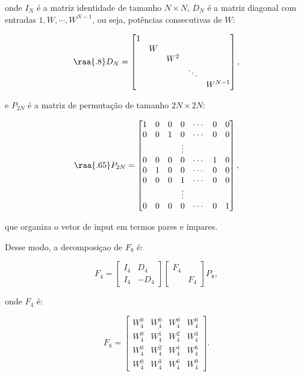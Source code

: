 onde $I_{N}$ é a matriz identidade de tamanho $N \times N$, $D_{N}$ é a matriz diagonal com entradas $1, W, \cdots, W^{N-1}$, ou seja, potências consecutivas de $W$:

\begin{equation*}
\raa{.8}
D_{N} = 
\begin{bmatrix}
1 &  &  &  & \\
 & W &  &  & \\
 &  & W^{2} &  & \\
 &  &  & \ddots  & \\
 &  &  &  & W^{N-1}
\end{bmatrix},
\end{equation*}

e $P_{2N}$ é a matriz de permutação de tamanho $2N \times 2N$: 

\begin{equation*}
\raa{.65}
P_{2N} = 
\begin{bmatrix}
1 & 0 & 0 &    0   & \cdots & 0 & 0\\
0 & 0 & 1 &    0   & \cdots & 0 & 0\\
  &   &   & \vdots &        &   &  \\
0 & 0 & 0 &    0   & \cdots & 1 & 0\\
0 & 1 & 0 &    0   & \cdots & 0 & 0\\
0 & 0 & 0 &    1   & \cdots & 0 & 0\\
  &   &   & \vdots &        &   &  \\
0 & 0 & 0 &    0   & \cdots & 0 & 1
\end{bmatrix},
\end{equation*}

que organiza o vetor de input em termos pares e ímpares.

Desse modo, a decomposiçao de $F_{8}$ é:

\begin{equation*}
F_{4} = 
\begin{bmatrix}
I_{4} & D_{4}\\
I_{4} & -D_{4} 
\end{bmatrix}
\begin{bmatrix}
F_{4} & \\
 & F_{4} 
\end{bmatrix}
P_{8},
\end{equation*}

onde $F_{4}$ é:

\begin{equation*}
F_{8} = 
\begin{bmatrix}
W_{4}^{0} & W_{4}^{0} & W_{4}^{0} & W_{4}^{0} \\
W_{4}^{0} & W_{4}^{1} & W_{4}^{2} & W_{4}^{3} \\
W_{4}^{0} & W_{4}^{2} & W_{4}^{4} & W_{4}^{6} \\
W_{4}^{0} & W_{4}^{3} & W_{4}^{6} & W_{4}^{9}
\end{bmatrix}.
\end{equation*}

